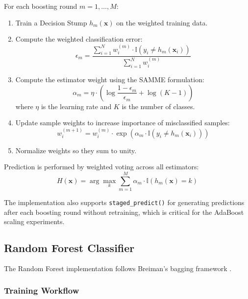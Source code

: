 \documentclass[conference,12pt]{IEEEtran}
\begin{document}
For each boosting round $m = 1, \ldots, M$:
\begin{enumerate}
    \item Train a Decision Stump $h_m(\mathbf{x})$ on the weighted training data.
    \item Compute the weighted classification error:
    \begin{equation}
    \epsilon_m = \frac{\sum_{i=1}^{N} w_i^{(m)} \cdot \mathbb{I}(y_i \neq h_m(\mathbf{x}_i))}{\sum_{i=1}^{N} w_i^{(m)}}
    \end{equation}
    \item Compute the estimator weight using the SAMME formulation:
    \begin{equation}
    \alpha_m = \eta \cdot \left( \log\frac{1-\epsilon_m}{\epsilon_m} + \log(K-1) \right)
    \end{equation}
    where $\eta$ is the learning rate and $K$ is the number of classes.
    \item Update sample weights to increase importance of misclassified samples:
    \begin{equation}
    w_i^{(m+1)} = w_i^{(m)} \cdot \exp\left( \alpha_m \cdot \mathbb{I}(y_i \neq h_m(\mathbf{x}_i)) \right)
    \end{equation}
    \item Normalize weights so they sum to unity.
\end{enumerate}

Prediction is performed by weighted voting across all estimators:
\begin{equation}
H(\mathbf{x}) = \arg\max_{k} \sum_{m=1}^{M} \alpha_m \cdot \mathbb{I}(h_m(\mathbf{x}) = k)
\end{equation}

The implementation also supports \texttt{staged\_predict()} for generating predictions after each boosting round without retraining, which is critical for the AdaBoost scaling experiments.

\subsection{Random Forest Classifier}

The Random Forest implementation follows Breiman's bagging framework \cite{breiman2001random}.

\subsubsection{Training Workflow}
\end{document}
